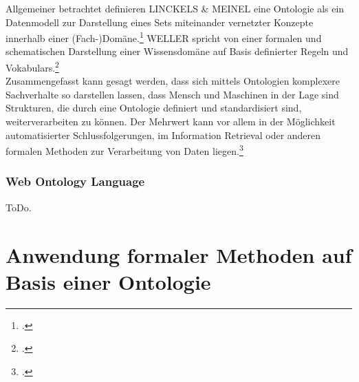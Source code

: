 \documentclass[12pt,a4paper]{article}
\begin{document}
Allgemeiner betrachtet definieren LINCKELS \& MEINEL eine Ontologie als ein Datenmodell zur Darstellung eines Sets miteinander vernetzter Konzepte innerhalb einer (Fach-)Domäne.\footcite{linckels2011librarian} WELLER spricht von einer formalen und schematischen Darstellung einer Wissensdomäne auf Basis definierter Regeln und Vokabulars.\footcite{weller2013InformationBand}
\\ 
Zusammengefasst kann gesagt werden, dass sich mittels Ontologien komplexere Sachverhalte so darstellen lassen, dass Mensch und Maschinen in der Lage sind Strukturen, die durch eine Ontologie definiert und standardisiert sind, weiterverarbeiten zu können. Der Mehrwert kann vor allem in der Möglichkeit automatisierter Schlussfolgerungen, im Information Retrieval oder anderen formalen Methoden zur Verarbeitung von Daten liegen.\footcite[][S.162-178]{jannidis2017digital} 

\subsubsection{Web Ontology Language}

ToDo.

\newpage
\section{Anwendung formaler Methoden auf Basis einer Ontologie}
\label{Umsetzung}
\end{document}
